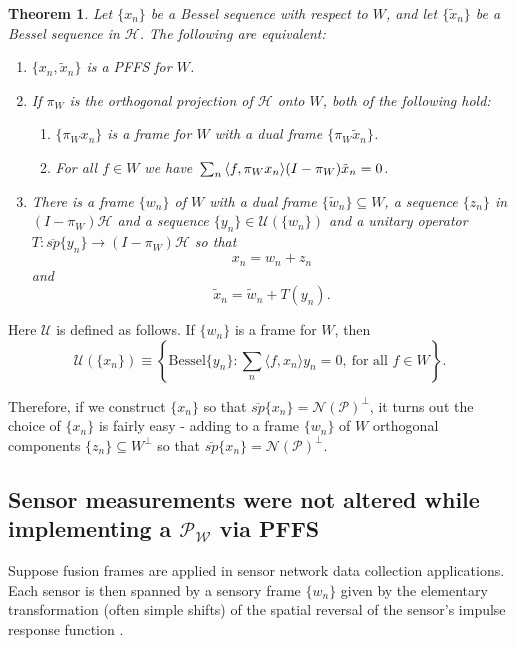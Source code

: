 \documentclass[11pt,reqno]{amsart}
\newtheorem{theorem}[thm]{Theorem}
\theoremstyle{remark}
\begin{document}
\begin{theorem} \label{thm_PFFS_vs_frame_for_X} {\rm\cite{LiOgPFFS98}}
Let $\{x_n\}$ be a Bessel sequence with respect to $W$, and let $\{\tilde x_n\}$ be a
Bessel sequence in ${\mathcal H}$. The following are equivalent:
\begin{enumerate}
\itemsep -2pt
\item $\{x_n, \tilde x_n\}$ is a PFFS for $W$.
\item If $\pi_W$ is the orthogonal projection of ${\mathcal H}$ onto $W$, both of
the following hold:
\begin{enumerate}
    \itemsep -2pt
    \item $\{\pi_W x_n\}$ is a frame for $W$ with a dual frame $\{\pi_W \tilde x_n\}$.
    \item For all $f\in W$ we have ${\displaystyle}\sum_n{\langle} f, \pi_W x_n{\rangle} (I-\pi_W)\tilde x_n = 0$.
\end{enumerate}
\item There is a frame $\{w_n\}$ of $W$ with a dual frame $\{\tilde w_n\}\subseteq W$, a
sequence $\{z_n\}$ in $(I-\pi_W){\mathcal H}$ and a sequence $\{y_n\}\in {\mathcal
U}(\{w_n\})$ and a unitary operator $T: {\overline{sp}}\{y_n\}\rightarrow (I-\pi_W){\mathcal H}$ so
that
\[
   x_n=w_n+z_n
\]
and
\[
   \tilde x_n =\tilde w_n +T(y_n).
\]
\end{enumerate}
\end{theorem}
Here ${\mathcal U}$ is defined as follows.  If $\{w_{n}\}$ is a frame for $W$, then
\[
{\mathcal U} (\{x_n \}) \equiv\left\{\mbox{Bessel} \{y_n \}:
\sum_{n} \langle f, x_n \rangle y_n = 0,\
\mbox{for all $f\in {W}$}\right\}.
\]

Therefore, if we construct $\{x_n\}$ so that ${\overline{sp}}\{x_n\}={{\mathcal N}}({{\mathcal P}})^{\perp}$, it turns out the choice of $\{x_n\}$ is fairly easy - adding to a frame $\{w_n\}$ of $W$ orthogonal components $\{z_n\}\subseteq W^{\perp}$ so that ${\overline{sp}}\{x_n\} = {{\mathcal N}}({{\mathcal P}})^{\perp}$.

\subsection{Sensor measurements were not altered while implementing a ${{\mathcal P}}_{{\mathcal W}}$ via PFFS}

Suppose fusion frames are applied in sensor network data collection applications.   Each sensor is then spanned by a sensory frame $\{w_n\}$ given by the elementary transformation (often simple shifts) of the spatial reversal of the sensor's impulse response function \cite{LiYan08}.
\end{document}
